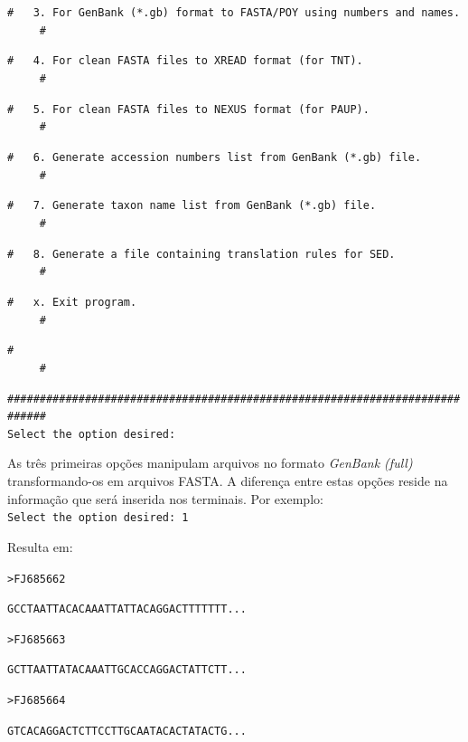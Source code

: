 \begin{refsection}
\noindent\texttt{\#~~~3.~For~GenBank~(*.gb)~format~to~FASTA/POY~using~numbers~and~names.~~~~~\#}

\noindent\texttt{\#~~~4.~For~clean~FASTA~files~to~XREAD~format~(for~TNT).~~~~~~~~~~~~~~~~~~~~\#}

\noindent\texttt{\#~~~5.~For~clean~FASTA~files~to~NEXUS~format~(for~PAUP).~~~~~~~~~~~~~~~~~~~\#}

\noindent\texttt{\#~~~6.~Generate~accession~numbers~list~from~GenBank~(*.gb)~file.~~~~~~~~~~~\#}

\noindent\texttt{\#~~~7.~Generate~taxon~name~list~from~GenBank~(*.gb)~file.~~~~~~~~~~~~~~~~~~\#}

\noindent\texttt{\#~~~8.~Generate~a~file~containing~translation~rules~for~SED.~~~~~~~~~~~~~~~\#}

\noindent\texttt{\#~~~x.~Exit~program.~~~~~~~~~~~~~~~~~~~~~~~~~~~~~~~~~~~~~~~~~~~~~~~~~~~~~~~\#}

\noindent\texttt{\#~~~~~~~~~~~~~~~~~~~~~~~~~~~~~~~~~~~~~~~~~~~~~~~~~~~~~~~~~~~~~~~~~~~~~~~~~~\#}

\noindent\texttt{\#\#\#\#\#\#\#\#\#\#\#\#\#\#\#\#\#\#\#\#\#\#\#\#\#\#\#\#\#\#\#\#\#\#\#\#\#\#\#\#\#\#\#\#\#\#\#\#\#\#\#\#\#\#\#\#\#\#\#\#\#\#\#\#\#\#\#\#\#\#\#\#\#\#\#\#}\\

\noindent\texttt{Select~the~option~desired:}

\normalsize

As três primeiras opções manipulam arquivos no formato \textit{GenBank (full)} transformando-os em arquivos FASTA. A diferença entre estas opções reside na informação que será inserida nos terminais. Por exemplo:\\

\texttt{Select the option desired: 1}\\

\vspace{1.cm}

Resulta em:\\

\scriptsize

\noindent\texttt{>FJ685662}

\noindent\texttt{GCCTAATTACACAAATTATTACAGGACTTTTTTT...}

\noindent\texttt{>FJ685663}

\noindent\texttt{GCTTAATTATACAAATTGCACCAGGACTATTCTT...}

\noindent\texttt{>FJ685664}

\noindent\texttt{GTCACAGGACTCTTCCTTGCAATACACTATACTG...}


\end{refsection}
